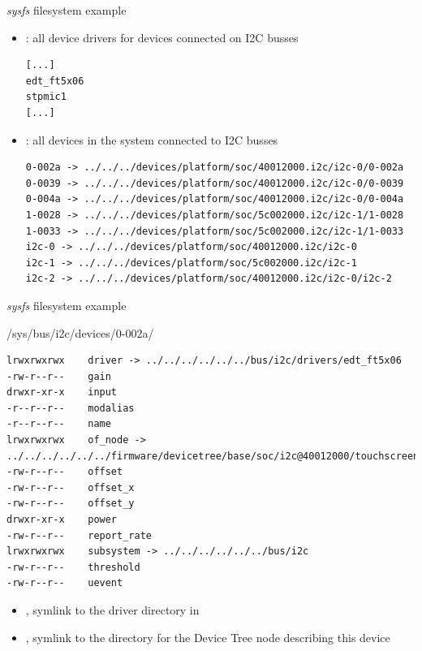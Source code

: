 \begin{frame}[fragile]{{\em sysfs} filesystem example}
  \begin{itemize}
  \item {}: all device drivers for devices
    connected on I2C busses
    \begin{block}{}
      {\tiny
\begin{verbatim}
[...]
edt_ft5x06
stpmic1
[...]
\end{verbatim}
      }
    \end{block}

  \item {}: all devices in the system
    connected to I2C busses
    \begin{block}{}
      {\tiny
\begin{verbatim}
0-002a -> ../../../devices/platform/soc/40012000.i2c/i2c-0/0-002a
0-0039 -> ../../../devices/platform/soc/40012000.i2c/i2c-0/0-0039
0-004a -> ../../../devices/platform/soc/40012000.i2c/i2c-0/0-004a
1-0028 -> ../../../devices/platform/soc/5c002000.i2c/i2c-1/1-0028
1-0033 -> ../../../devices/platform/soc/5c002000.i2c/i2c-1/1-0033
i2c-0 -> ../../../devices/platform/soc/40012000.i2c/i2c-0
i2c-1 -> ../../../devices/platform/soc/5c002000.i2c/i2c-1
i2c-2 -> ../../../devices/platform/soc/40012000.i2c/i2c-0/i2c-2
\end{verbatim}
      }
    \end{block}
  \end{itemize}
\end{frame}

\begin{frame}[fragile]{{\em sysfs} filesystem example}
  \begin{block}{/sys/bus/i2c/devices/0-002a/}
    {\tiny
\begin{verbatim}
lrwxrwxrwx    driver -> ../../../../../../bus/i2c/drivers/edt_ft5x06
-rw-r--r--    gain
drwxr-xr-x    input
-r--r--r--    modalias
-r--r--r--    name
lrwxrwxrwx    of_node -> ../../../../../../firmware/devicetree/base/soc/i2c@40012000/touchscreen@2a
-rw-r--r--    offset
-rw-r--r--    offset_x
-rw-r--r--    offset_y
drwxr-xr-x    power
-rw-r--r--    report_rate
lrwxrwxrwx    subsystem -> ../../../../../../bus/i2c
-rw-r--r--    threshold
-rw-r--r--    uevent
\end{verbatim}
    }
  \end{block}

  \begin{itemize}
  \item {}, symlink to the driver directory in 
  \item {}, symlink to the directory for the Device Tree
    node describing this device
  \end{itemize}
\end{frame}

